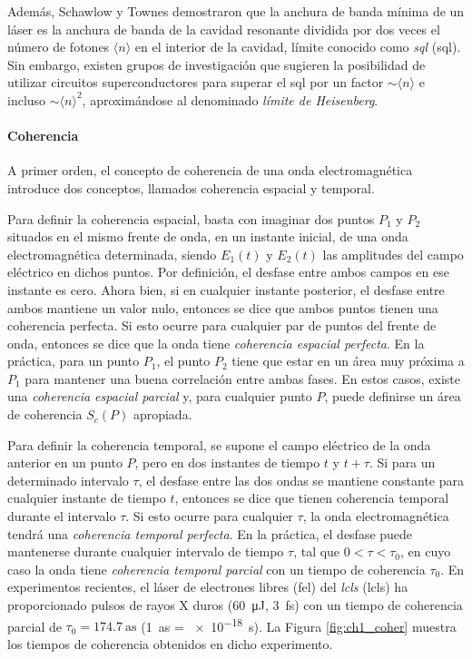 Además, Schawlow y Townes demostraron que la anchura de banda mínima de un láser es la anchura de banda de la cavidad resonante dividida por dos veces el número de fotones $\langle n\rangle$ en el interior de la cavidad, límite conocido como \emph{\acrlong{sql}} (\acrshort{sql}). Sin embargo, existen grupos de investigación\autocite{liuProposalContinuousWave2021} que sugieren la posibilidad de utilizar circuitos superconductores para superar el \acrshort{sql} por un factor $\sim\langle n\rangle$ e incluso $\sim\langle n\rangle^2$, aproximándose al denominado \emph{límite de Heisenberg}.

\paragraph{Coherencia}\label{par:1.1.2.2}
A primer orden, el concepto de coherencia de una onda electromagnética introduce dos conceptos, llamados coherencia espacial y temporal\autocite{sveltoPrinciplesLasers2010}.

Para definir la coherencia espacial, basta con imaginar dos puntos $P_1$ y $P_2$ situados en el mismo frente de onda, en un instante inicial, de una onda electromagnética determinada, siendo $E_1(t)$ y $E_2(t)$ las amplitudes del campo eléctrico en dichos puntos. Por definición, el desfase entre ambos campos en ese instante es cero. Ahora bien, si en cualquier instante posterior, el desfase entre ambos mantiene un valor nulo, entonces se dice que ambos puntos tienen una coherencia perfecta. Si esto ocurre para cualquier par de puntos del frente de onda, entonces se dice que la onda tiene \emph{coherencia espacial perfecta}. En la práctica, para un punto $P_1$, el punto $P_2$ tiene que estar en un área muy próxima a $P_1$ para mantener una buena correlación entre ambas fases. En estos casos, existe una \emph{coherencia espacial parcial} y, para cualquier punto $P$, puede definirse un área de coherencia $S_c(P)$ apropiada.

Para definir la coherencia temporal, se supone el campo eléctrico de la onda anterior en un punto $P$, pero en dos instantes de tiempo $t$ y $t+\tau$. Si para un determinado intervalo $\tau$, el desfase entre las dos ondas se mantiene constante para cualquier instante de tiempo $t$, entonces se dice que tienen coherencia temporal durante el intervalo $\tau$. Si esto ocurre para cualquier $\tau$, la onda electromagnética tendrá una \emph{coherencia temporal perfecta}. En la práctica, el desfase puede mantenerse durante cualquier intervalo de tiempo $\tau$, tal que $0<\tau<\tau_0$, en cuyo caso la onda tiene \emph{coherencia temporal parcial} con un tiempo de coherencia $\tau_0$. En experimentos recientes\autocite{zhouAttosecondCoherenceTime2020}, el láser de electrones libres (\acrshort{fel}) del \emph{\acrlong{lcls}} (\acrshort{lcls}) ha proporcionado pulsos de rayos X duros (\qty{60}{\uJ}, \qty{3}{\fs}) con un tiempo de coherencia parcial de $\tau_0 = \qty{174,7}{\as}$ (\qty{1}{\as} = \qty{e-18}{\s}). La Figura \ref{fig:ch1_coher} muestra los tiempos de coherencia obtenidos en dicho experimento. 

